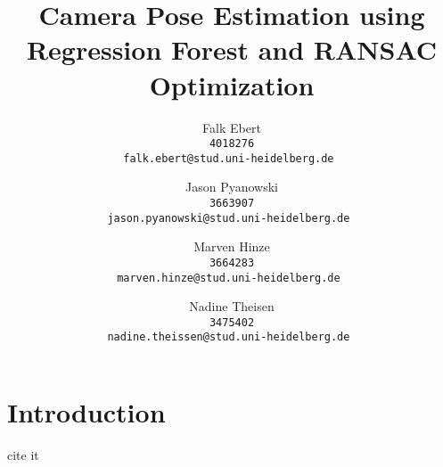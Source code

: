 \documentclass[final]{cvpr}
\begin{document}
\title{Camera Pose Estimation using Regression Forest and RANSAC Optimization}

\author{Falk Ebert\\
\tt 4018276\\
{\tt\small falk.ebert@stud.uni-heidelberg.de}
\and
Jason Pyanowski\\
\tt 3663907\\
{\tt\small jason.pyanowski@stud.uni-heidelberg.de}
\and
Marven Hinze\\
\tt 3664283\\
{\tt\small marven.hinze@stud.uni-heidelberg.de}
\and
Nadine Theisen\\
\tt 3475402\\
{\tt\small nadine.theissen@stud.uni-heidelberg.de}
}

\maketitle


\begin{abstract}
   
\end{abstract}

\section{Introduction}
cite it~\cite{shotton2013}
\end{document}
